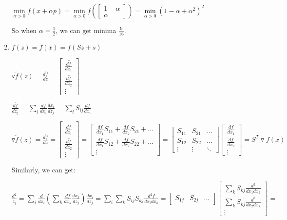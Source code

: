 \documentclass[12pt]{article}
\begin{document}
\begin{enumerate}
$\underset{\alpha>0}{\min} f(x + \alpha p) = \underset{\alpha>0}{\min} f(\begin{bmatrix} 1-\alpha \\ \alpha \end{bmatrix}) = \underset{\alpha>0}{\min} (1-\alpha + \alpha^2)^2$

So when $\alpha = \frac{1}{2}$, we can get minima $\frac{9}{16}$.






\bigskip
\item

$\tilde f(z) = f(x) = f(Sz+s)$

$ \triangledown \tilde f(z) = \frac{d \tilde f}{dz} =  \begin{bmatrix}  \frac{d \tilde f}{dz_1} \\  \frac{d \tilde f}{dz_2} \\ \vdots \end{bmatrix} $

$ \frac{d \tilde f}{dz_j} = \underset{i}{\sum} \frac{df}{dx_i}  \frac{dx_i}{dz_j} = \underset{i}{\sum} S_{ij} \frac{df}{dx_i}$

$ \triangledown \tilde f(z) = \frac{d \tilde f}{dz} =  \begin{bmatrix}  \frac{d \tilde f}{dz_1}  \\  \frac{d \tilde f}{dz_2} \\ \vdots \end{bmatrix} =
\begin{bmatrix}\frac{df}{dx_1}S_{11} + \frac{df}{dx_2}S_{21} + \hdots \\ \frac{df}{dx_1}S_{12} + \frac{df}{dx_2}S_{22} + \hdots \\ \vdots \end{bmatrix} =
\begin{bmatrix}S_{11} & S_{21} & \hdots \\ S_{12} & S_{22} & \hdots \\ \vdots & \vdots & \ddots \end{bmatrix} \begin{bmatrix} \frac{df}{dx_1} \\ \frac{df}{dx_2} \\ \vdots \end{bmatrix} =
S^T \triangledown f(x)$

Similarly, we can get:

$\frac{d^2}{z_j} = \underset{i}{\sum} \frac{d}{dx_i} (\underset{k}{\sum} \frac{df}{dx_k} \frac{dx_k}{dz_j} ) \frac{dx_i}{dz_j}=
\underset{i}{\sum} \underset{k}{\sum} S_{ij} S_{kj} \frac{d^2f}{dx_i dx_k} =
\begin{bmatrix} S_{1j} & S_{2j} & \hdots \end{bmatrix} \begin{bmatrix} \underset{k}{\sum} S_{kj} \frac{d^2}{dx_1 dx_k} \\ \underset{k}{\sum} S_{kj} \frac{d^2}{dx_2 dx_k} \\ \vdots \end{bmatrix} = $


\end{enumerate}
\end{document}
